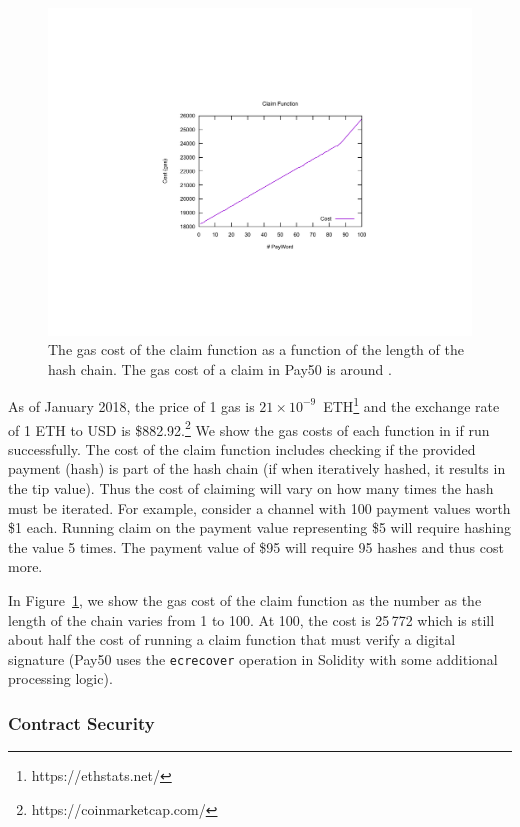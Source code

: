 \begin{figure}[t]
\centering
\includegraphics[width=\linewidth]{figures/gas.pdf}
\caption{The gas cost of the claim function as a function of the length of the hash chain. The gas cost of a claim in \textsf{Pay50} is around .\label{fig:gas}}
\end{figure}

As of January 2018, the price of 1 gas is $21\times10^{-9}$~ETH\footnote{https://ethstats.net/} and the exchange rate of 1 ETH to USD is \$882.92.\footnote{https://coinmarketcap.com/} We show the gas costs of each function in \ew if run successfully. The cost of the claim function includes checking if the provided payment (hash) is part of the hash chain (if when iteratively hashed, it results in the tip value). Thus the cost of claiming will vary on how many times the hash must be iterated. For example, consider a channel with 100 payment values worth \$1 each. Running claim on the payment value representing \$5 will require hashing the value 5 times. The payment value of \$95 will require 95 hashes and thus cost more. 

In Figure~\ref{fig:gas}, we show the gas cost of the claim function as the number as the length of the chain varies from 1 to 100. At 100, the cost is 25\,772 which is still about half the cost of running a claim function that must verify a digital signature (\eg \textsf{Pay50} uses the \texttt{ecrecover} operation in Solidity with some additional processing logic).

\subsubsection{Contract Security}

